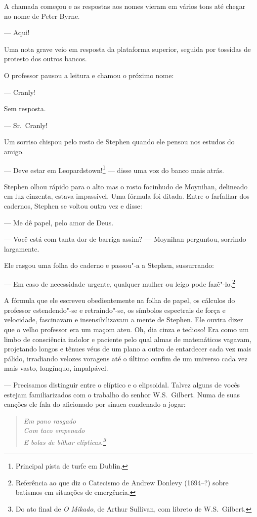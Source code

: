 A chamada começou e as respostas aos nomes vieram em vários tons até
chegar no nome de Peter Byrne.

 --- Aqui!

Uma nota grave veio em resposta da plataforma superior, seguida por
tossidas de protesto dos outros bancos.

O professor pausou a leitura e chamou o próximo nome:

 --- Cranly!

Sem resposta.

 --- Sr.~Cranly!

Um sorriso chispou pelo rosto de Stephen quando ele pensou nos estudos
do amigo.

 --- Deve estar em Leopardstown!\footnote{ Principal pista de turfe em
Dublin.} --- disse uma voz do banco mais atrás.

Stephen olhou rápido para o alto mas o rosto focinhudo de Moynihan,
delineado em luz cinzenta, estava impassível. Uma fórmula foi ditada.
Entre o farfalhar dos cadernos, Stephen se voltou outra vez e disse:

 --- Me dê papel, pelo amor de Deus.

 --- Você está com tanta dor de barriga assim? --- Moynihan perguntou, sorrindo
largamente.

Ele rasgou uma folha do caderno e passou"-a a Stephen, sussurrando:

 --- Em caso de necessidade urgente, qualquer mulher ou leigo pode
fazê"-lo.\footnote{ Referência ao que diz o Catecismo de Andrew Donlevy
(1694--?) sobre batismos em situações de emergência.}

A fórmula que ele escreveu obedientemente na folha de papel, os cálculos
do professor estendendo"-se e retraindo"-se, os símbolos espectrais de
força e velocidade, fascinavam e insensibilizavam a mente de Stephen.
Ele ouvira dizer que o velho professor era um maçom ateu. Oh, dia cinza
e tedioso! Era como um limbo de consciência indolor e paciente pelo
qual almas de matemáticos vagavam, projetando longos e tênues véus de
um plano a outro de entardecer cada vez mais pálido, irradiando velozes
voragens até o último confim de um universo cada vez mais vasto,
longínquo, impalpável.

 --- Precisamos distinguir entre o elíptico e o elipsoidal. Talvez alguns
de vocês estejam familiarizados com o trabalho do senhor W.S.~Gilbert.
Numa de suas canções ele fala do aficionado por sinuca condenado a
jogar:

\begin{verse}\itshape
Em pano rasgado\\
Com taco empenado\\
E bolas de bilhar elípticas.\footnote{ Do ato final de \textit{O
Mikado}, de Arthur Sullivan, com libreto de W.S.~Gilbert.}
\end{verse}

